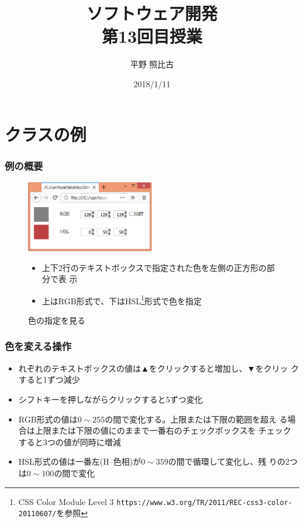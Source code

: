 
\title{ソフトウェア開発\\第13回目授業}
\author{平野 照比古}
\institute{}
\date{2018/1/11}
\newtheorem{Prob}{解説}
\newcommand{\Elm}[1]{\texttt{<#1>}}

\newcommand{\DOMM}{\texttt}
\newcommand{\Event}{\texttt}
\newcommand{\DOMP}{\texttt}
\newcommand{\DOM}{\texttt{DOM}}
\newcommand{\keyitem}{\relax}
\newcommand{\HTML}{HTML文書}

\frame{\maketitle}
\section{クラスの例}
 \begin{frame}[containsverbatim]
  \frametitle{例の概要}
\begin{figure}[ht]
 \begin{center}
  \includegraphics[width=0.5\textwidth]{../13Ex.eps}
 \end{center}
 \caption{色の指定を見る}\label{color}
 \begin{itemize}
  \item 上下2行のテキストボックスで指定された色を左側の正方形の部分で表
        示
  \item 上はRGB形式で、下はHSL\footnote{CSS Color Module Level
3 \texttt{https://www.w3.org/TR/2011/REC-css3-color-20110607/}を参照}形式で色を指定
 \end{itemize}
\end{figure}
 \end{frame}
 \begin{frame}[containsverbatim]
  \frametitle{色を変える操作}
  \begin{itemize}
   \item れぞれのテキストボックスの値は▲をクリックすると増加し、▼をクリッ
       クすると1ずつ減少
   \item シフトキーを押しながらクリックすると5ずつ変化
   \item RGB形式の値は$0\sim255$の間で変化する。上限または下限の範囲を超え
       る場合は上限または下限の値にのままで一番右のチェックボックスを
       チェックすると3つの値が同時に増減
   \item HSL形式の値は一番左(H--色相)が$0\sim359$の間で循環して変化し、残
       りの2つは$0\sim100$の間で変化
  \end{itemize}
 \end{frame}
